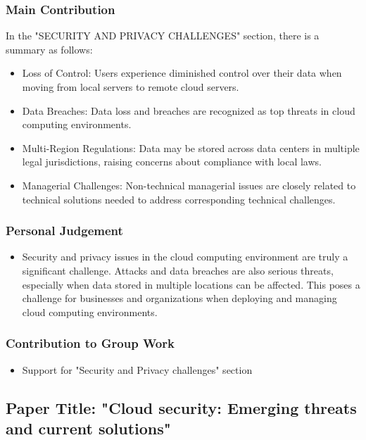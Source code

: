 \documentclass[12pt, twoside]{article}
\begin{document}
\subsubsection{Main Contribution}
In the "SECURITY AND PRIVACY CHALLENGES" section, there is a summary as follows:
\begin{itemize}
    \item Loss of Control: Users experience diminished control over their data when moving from local servers to remote cloud servers.
    \item Data Breaches: Data loss and breaches are recognized as top threats in cloud computing environments.
    \item Multi-Region Regulations: Data may be stored across data centers in multiple legal jurisdictions, raising concerns about compliance with local laws.
    \item Managerial Challenges: Non-technical managerial issues are closely related to technical solutions needed to address corresponding technical challenges.
\end{itemize}

\subsubsection{Personal Judgement}
\begin{itemize}
    \item Security and privacy issues in the cloud computing environment are truly a significant challenge. Attacks and data breaches are also serious threats, especially when data stored in multiple locations can be affected. This poses a challenge for businesses and organizations when deploying and managing cloud computing environments.
\end{itemize}

\subsubsection{Contribution to Group Work}
\begin{itemize}
    \item Support for "Security and Privacy challenges" section
\end{itemize}
\subsection{Paper Title: "Cloud security: Emerging threats and current solutions" \cite{coppolino2017cloud}}
\end{document}
